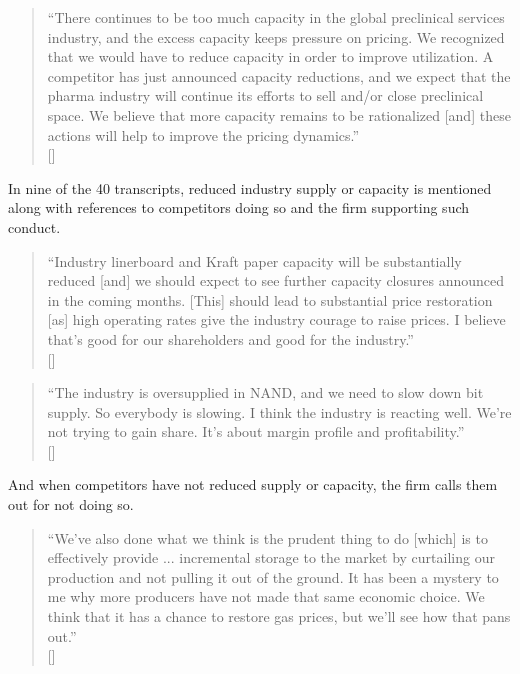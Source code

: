\begin{quote}
``There continues to be too much capacity in the global preclinical services industry, and the excess capacity keeps pressure on pricing. We recognized that we would have to reduce capacity in order to improve utilization. A competitor has just announced capacity reductions, and we expect that the pharma industry will continue its efforts to sell and/or close preclinical space. We believe that more capacity remains to be rationalized [and] these actions will help to improve the pricing dynamics.'' \\
\mbox{[]}
\end{quote}

In nine of the 40 transcripts, reduced industry supply or capacity is mentioned along with references to competitors doing so and the firm supporting such conduct.

\begin{quote}
``Industry linerboard and Kraft paper capacity will be substantially reduced [and] we should expect to see further capacity closures announced in the coming months. [This] should lead to substantial price restoration [as] high operating rates give the industry courage to raise prices. I believe that's good for our shareholders and good for the industry.'' \\
\mbox{[]}
\end{quote}

\begin{quote}
``The industry is oversupplied in NAND, and we need to slow down bit supply. So everybody is slowing. I think the industry is reacting well. We're not trying to gain share. It's about margin profile and profitability.'' \\
\mbox{[]}
\end{quote}

And when competitors have not reduced supply or capacity, the firm calls them out for not doing so.

\begin{quote}
``We've also done what we think is the prudent thing to do [which] is to effectively provide ... incremental storage to the market by curtailing our production and not pulling it out of the ground. It has been a mystery to me why more producers have not made that same economic choice. We think that it has a chance to restore gas prices, but we'll see how that pans out.'' \\
\mbox{[]}
\end{quote}

